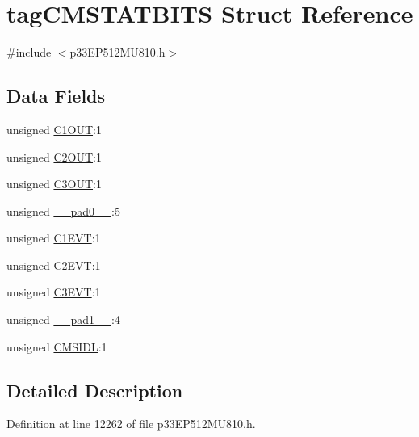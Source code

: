 \hypertarget{structtag_c_m_s_t_a_t_b_i_t_s}{}\section{tag\+C\+M\+S\+T\+A\+T\+B\+I\+TS Struct Reference}
\label{structtag_c_m_s_t_a_t_b_i_t_s}


{\ttfamily \#include $<$p33\+E\+P512\+M\+U810.\+h$>$}

\subsection*{Data Fields}
\begin{DoxyCompactItemize}
\item 
unsigned \hyperlink{structtag_c_m_s_t_a_t_b_i_t_s_ac92ec38a908579dba4576b58d83b448b}{C1\+O\+UT}\+:1
\item 
unsigned \hyperlink{structtag_c_m_s_t_a_t_b_i_t_s_a97b4baf2ebfd7bb4d0a6f4be6665c7ab}{C2\+O\+UT}\+:1
\item 
unsigned \hyperlink{structtag_c_m_s_t_a_t_b_i_t_s_a1168ba74c2f65affe96009728486d762}{C3\+O\+UT}\+:1
\item 
unsigned \hyperlink{structtag_c_m_s_t_a_t_b_i_t_s_adf71f3d8410c1f1dbbc96680a92c49af}{\+\_\+\+\_\+pad0\+\_\+\+\_\+}\+:5
\item 
unsigned \hyperlink{structtag_c_m_s_t_a_t_b_i_t_s_acb7ee136b83067f36d2dadab8625b1a7}{C1\+E\+VT}\+:1
\item 
unsigned \hyperlink{structtag_c_m_s_t_a_t_b_i_t_s_aec68f11a447fc00b2a632bb8aae3899e}{C2\+E\+VT}\+:1
\item 
unsigned \hyperlink{structtag_c_m_s_t_a_t_b_i_t_s_a12277a444d526f913bb692c4aff46c78}{C3\+E\+VT}\+:1
\item 
unsigned \hyperlink{structtag_c_m_s_t_a_t_b_i_t_s_acaf2d0924a107ec6e8d2e31febaf66f9}{\+\_\+\+\_\+pad1\+\_\+\+\_\+}\+:4
\item 
unsigned \hyperlink{structtag_c_m_s_t_a_t_b_i_t_s_ade32d9beff74e352daa224124b7f49d2}{C\+M\+S\+I\+DL}\+:1
\end{DoxyCompactItemize}


\subsection{Detailed Description}


Definition at line 12262 of file p33\+E\+P512\+M\+U810.\+h.



